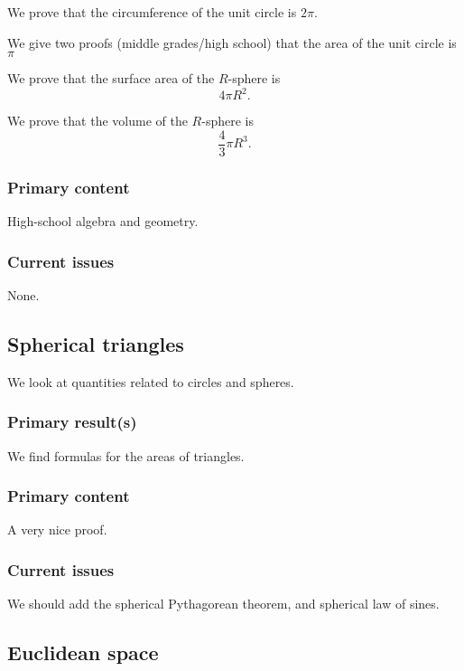 \documentclass{amsart}
\begin{document}
We prove that the circumference of the unit circle is $2\pi$.

We give two proofs (middle grades/high school) that the area of the
unit circle is $\pi$

We prove that the surface area of the $R$-sphere is
\[
4\pi R^2.
\]

We prove that the volume of the $R$-sphere is
\[
\frac{4}{3}\pi R^3.
\]


\subsubsection{Primary content}

High-school algebra and geometry.

\subsubsection{Current issues}

None.




\subsection{Spherical triangles}

We look at quantities related to circles and spheres.


\subsubsection{Primary result(s)}

We find formulas for the areas of triangles. 


\subsubsection{Primary content}

A very nice proof.

\subsubsection{Current issues}

We should add the spherical Pythagorean theorem, and spherical law of sines.





\subsection{Euclidean space}
\end{document}
